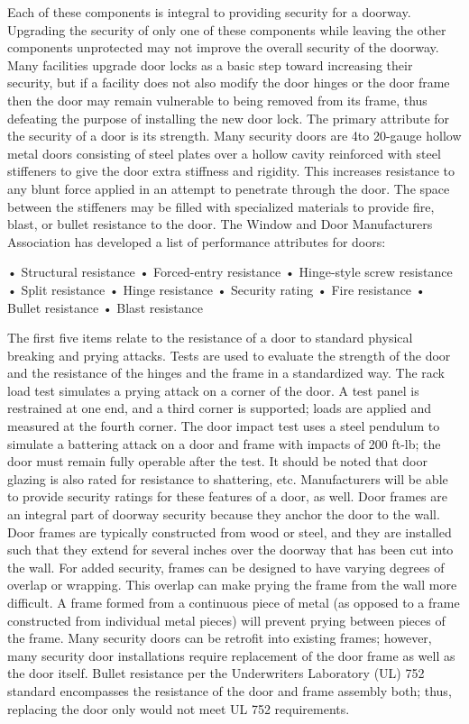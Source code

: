 \documentclass{article}
\begin{document}
Each of these components is integral to providing security for a
doorway. Upgrading the security of only one of these components while
leaving the other components unprotected may not improve the overall
security of the doorway. Many facilities upgrade door locks as a basic
step toward increasing their security, but if a facility does not also
modify the door hinges or the door frame then the door may remain
vulnerable to being removed from its frame, thus defeating the purpose
of installing the new door lock. The primary attribute for the security
of a door is its strength. Many security doors are 4to 20-gauge hollow
metal doors consisting of steel plates over a hollow cavity reinforced
with steel stiffeners to give the door extra stiffness and rigidity.
This increases resistance to any blunt force applied in an attempt to
penetrate through the door. The space between the stiffeners may be
filled with specialized materials to provide fire, blast, or bullet
resistance to the door. The Window and Door Manufacturers Association
has developed a list of performance attributes for doors:

• Structural resistance • Forced-entry resistance • Hinge-style screw
resistance • Split resistance • Hinge resistance • Security rating •
Fire resistance • Bullet resistance • Blast resistance

The first five items relate to the resistance of a door to standard
physical breaking and prying attacks. Tests are used to evaluate the
strength of the door and the resistance of the hinges and the frame in a
standardized way. The rack load test simulates a prying attack on a
corner of the door. A test panel is restrained at one end, and a third
corner is supported; loads are applied and measured at the fourth
corner. The door impact test uses a steel pendulum to simulate a
battering attack on a door and frame with impacts of 200 ft-lb; the door
must remain fully operable after the test. It should be noted that door
glazing is also rated for resistance to shattering, etc. Manufacturers
will be able to provide security ratings for these features of a door,
as well. Door frames are an integral part of doorway security because
they anchor the door to the wall. Door frames are typically constructed
from wood or steel, and they are installed such that they extend for
several inches over the doorway that has been cut into the wall. For
added security, frames can be designed to have varying degrees of
overlap or wrapping. This overlap can make prying the frame from the
wall more difficult. A frame formed from a continuous piece of metal (as
opposed to a frame constructed from individual metal pieces) will
prevent prying between pieces of the frame. Many security doors can be
retrofit into existing frames; however, many security door installations
require replacement of the door frame as well as the door itself. Bullet
resistance per the Underwriters Laboratory (UL) 752 standard encompasses
the resistance of the door and frame assembly both; thus, replacing the
door only would not meet UL 752 requirements.
\end{document}
